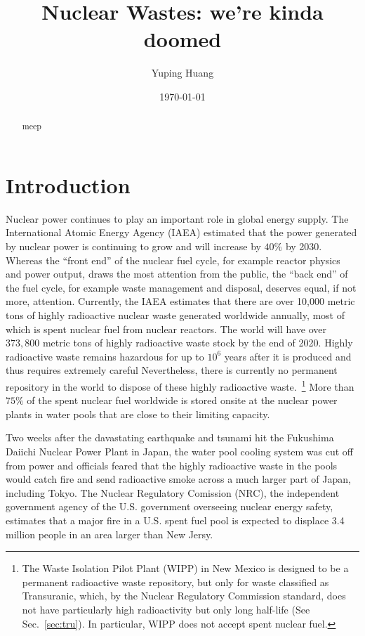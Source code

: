 \documentclass[nofootinbib,preprint,aip,pra]{revtex4-1}
\begin{document}
\title{Nuclear Wastes: we're kinda doomed}

\author{Yuping Huang}%

\date{\today}%
\begin{abstract}
    meep
\end{abstract}
\maketitle
\tableofcontents
\newpage

\section{Introduction}
Nuclear power continues to play an important role in global energy supply.
The International Atomic Energy Agency (IAEA) estimated that the power generated by nuclear power
is continuing to grow and will increase by $40\%$ by 2030.\cite{iaea12}
Whereas the ``front end'' of the nuclear fuel cycle, for example reactor physics and power output, draws
the most attention from the public, the ``back end'' of the fuel cycle, for example waste management and
disposal, deserves equal, if not more, attention.
Currently, the IAEA estimates that there are over 10,000 metric tons of highly radioactive nuclear waste 
generated worldwide annually,
most of which is spent nuclear fuel from nuclear reactors.\cite{iaea08, r12}
The world will have over $373,800$ metric tons of highly radioactive waste stock by the end of 2020.\cite{r12}
Highly radioactive waste remains hazardous for up to $10^6$ years after it is produced and thus requires extremely
careful 
Nevertheless, there is currently no permanent repository in the world to dispose of these highly radioactive
waste.~\footnote{The Waste Isolation Pilot Plant (WIPP) in New Mexico is designed to be a permanent radioactive
    waste repository, but only
for waste classified as Transuranic, which, by the Nuclear Regulatory Commission standard, does not have particularly
high radioactivity but only long half-life (See Sec.~\ref{sec:tru}). In particular, WIPP does not accept spent nuclear
fuel.}  More than $75\%$ of the spent nuclear fuel worldwide is stored onsite at the nuclear power plants in
water pools that are close to their limiting capacity.\cite{aa12}

Two weeks after the davastating earthquake and tsunami hit the Fukushima Daiichi Nuclear Power Plant in Japan,
the water pool cooling system was cut off from power and officials feared that
the highly radioactive waste in the pools would catch fire and send radioactive smoke across a much larger part of Japan, including Tokyo.
The Nuclear Regulatory Comission (NRC), the independent government agency of the U.S. government overseeing 
nuclear energy safety,
estimates that a major fire in a U.S. spent fuel pool is expected to
displace 3.4 million people in an area larger than New Jersy.\cite{s16}
\end{document}
